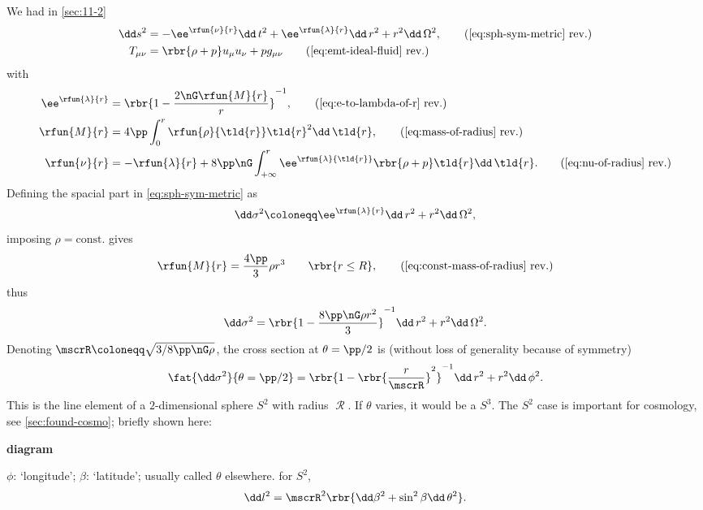 We had in \cref{sec:11-2}
\begin{align}
\dd s^2 &= -\ee^{\rfun{\nu}{r}}\dd\, t^2 + \ee^{\rfun{\lambda}{r}}\dd\, r^2
+ r^2\dd\,\Omega^2,
\tag{\ref{eq:sph-sym-metric} rev.} \\
T_{\mu\nu} &= \rbr{\rho+p}u_\mu u_\nu + pg_{\mu\nu}
\tag{\ref{eq:emt-ideal-fluid} rev.}
\end{align}
with
\begin{align}
\ee^{\rfun{\lambda}{r}} &= \rbr{1-\frac{2\nG\rfun{M}{r}}{r}}^{-1},
\tag{\ref{eq:e-to-lambda-of-r} rev.} \\
\rfun{M}{r} &= 4\pp\int_0^r\rfun{\rho}{\tld{r}}\tld{r}^2\dd\,\tld{r},
\tag{\ref{eq:mass-of-radius} rev.} \\
\rfun{\nu}{r} &= -\rfun{\lambda}{r} + 8\pp\nG\int_{+\infty}^r
\ee^{\rfun{\lambda}{\tld{r}}}\rbr{\rho+p}\tld{r}\dd\,\tld{r}.
\tag{\ref{eq:nu-of-radius} rev.}
\end{align}
Defining the spacial part in \cref{eq:sph-sym-metric} as
\begin{equation}
\dd\sigma^2 \coloneqq \ee^{\rfun{\lambda}{r}}\dd\, r^2 + r^2\dd\,\Omega^2,
\end{equation}
imposing $\rho = \text{const.}$ gives
\begin{equation}
\rfun{M}{r} = \frac{4\pp}{3}\rho r^3\qquad\rbr{r \le R},
\tag{\ref{eq:const-mass-of-radius} rev.}
\end{equation}
thus
\begin{equation}
\dd\sigma^2 = \rbr{1-\frac{8\pp\nG\rho r^2}{3}}^{-1}\dd\, r^2
+ r^2\dd\,\Omega^2.
\end{equation}
Denoting $\mscrR \coloneqq \sqrt{3/8\pp\nG\rho}$, the cross section at $\theta
= \pp/2$ is (without loss of generality because of symmetry)
\begin{equation}
\fat{\dd\sigma^2}{\theta = \pp/2} = 
\rbr{1-\rbr{\frac{r}{\mscrR}}^2}^{-1} \dd\, r^2 + r^2\dd\,\phi^2.
\end{equation}
This is the line element of a $2$-dimensional sphere $S^2$ with radius
$\mscrR$. If $\theta$ varies, it would be a $S^3$. The $S^2$ case is important
for cosmology, see \cref{sec:found-cosmo}; briefly shown here:

\textbf{diagram}

$\phi$: `longitude'; $\beta$: `latitude'; usually called $\theta$ elsewhere.
for $S^2$,
\begin{equation}
\dd l^2 = \mscrR^2\rbr{\dd\beta^2 + \sin^2\beta\dd\,\theta^2}.
\end{equation}

